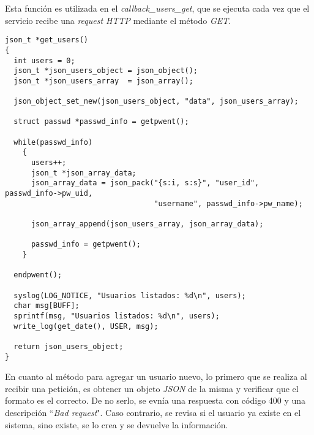 \documentclass[12pt,a4paper]{article}
\begin{document}
Esta función es utilizada en el \emph{callback\_users\_get}, que se
ejecuta cada vez que el servicio recibe una \emph{request HTTP} mediante el
método \emph{GET}.

\begin{lstlisting}[caption={Función `\emph{get\_users()}'.}, label={get}, language=Ce]
json_t *get_users()
{
  int users = 0;
  json_t *json_users_object = json_object();
  json_t *json_users_array  = json_array();

  json_object_set_new(json_users_object, "data", json_users_array);

  struct passwd *passwd_info = getpwent();

  while(passwd_info)
    {
      users++;
      json_t *json_array_data;
      json_array_data = json_pack("{s:i, s:s}", "user_id", passwd_info->pw_uid,
                                  "username", passwd_info->pw_name);

      json_array_append(json_users_array, json_array_data);

      passwd_info = getpwent();
    }

  endpwent();

  syslog(LOG_NOTICE, "Usuarios listados: %d\n", users);
  char msg[BUFF];
  sprintf(msg, "Usuarios listados: %d\n", users);
  write_log(get_date(), USER, msg);

  return json_users_object;
}
\end{lstlisting}

\newpage
En cuanto al método para agregar un usuario nuevo, lo primero que se realiza al
recibir una petición, es obtener un objeto \emph{JSON} de la misma y verificar
que el formato es el correcto. De no serlo, se evnía una respuesta con código
400 y una descripción ``\emph{Bad request}". Caso contrario, se revisa si el
usuario ya existe en el sistema, sino existe, se lo crea y se devuelve la información.
\end{document}
